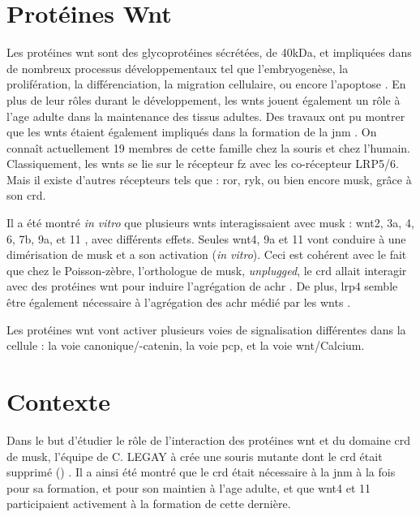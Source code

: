 \section{Protéines Wnt}
	\label{sec:IntroWnt}
	
	Les protéines \gls{wnt} sont des glycoprotéines sécrétées, de 40kDa, et impliquées dans de nombreux processus développementaux tel que l'embryogenèse, la prolifération, la différenciation, la migration cellulaire, ou encore l'apoptose \cite{Miller2002, Willert2012a}. En plus de leur rôles durant le développement, les \gls{wnt}s jouent également un rôle à l'age adulte dans la maintenance des tissus adultes. Des travaux ont pu montrer que les \gls{wnt}s étaient également impliqués dans la formation de la \gls{jnm} \cite{Hall2000}. On connaît actuellement 19 membres de cette famille chez la souris et chez l'humain. Classiquement, les \gls{wnt}s se lie sur le récepteur \gls{fz} avec les co-récepteur LRP5/6. Mais il existe d'autres récepteurs tels que : \gls{ror}, \gls{ryk}, ou bien encore \gls{musk}, grâce à son \gls{crd}.
	
	Il a été montré \emph{in vitro} que plusieurs \gls{wnt}s interagissaient avec \gls{musk} : \gls{wnt}2, 3a, 4, 6, 7b, 9a, et 11 \cite{Strochlic2012, Zhang2012, Barik2014}, avec différents effets. Seules \gls{wnt}4, 9a et 11 vont conduire à une dimérisation de \gls{musk} et a son activation (\emph{in vitro}). Ceci est cohérent avec le fait que chez le Poisson-zèbre, l'orthologue de \gls{musk}, \emph{unplugged}, le \gls{crd} allait interagir avec des protéines \gls{wnt} pour induire l'agrégation de \gls{achr} \cite{Jing2009, Gordon2012}. De plus, \gls{lrp4} semble être également nécessaire à l'agrégation des \gls{achr} médié par les \gls{wnt}s \cite{Zhang2012}.
	
	Les protéines \gls{wnt} vont activer plusieurs voies de signalisation différentes dans la cellule :  la voie canonique/\textbeta-catenin, la voie \gls{pcp}, et la voie \gls{wnt}/Calcium. 

\section{Contexte}
	\label{sec:Contexte}
	
	Dans le but d'étudier le rôle de l'interaction des protéines \gls{wnt} et du domaine \gls{crd} de \gls{musk}, l'équipe de C. LEGAY à crée une souris mutante dont le \gls{crd} était supprimé (\mcrd) \cite{Messeant2015, Messeant2017}. Il a ainsi été montré que le \gls{crd} était nécessaire à la \gls{jnm} à la fois pour sa formation, et pour son maintien à l'age adulte, et que \gls{wnt}4 et 11 participaient activement à la formation de cette dernière.
	
